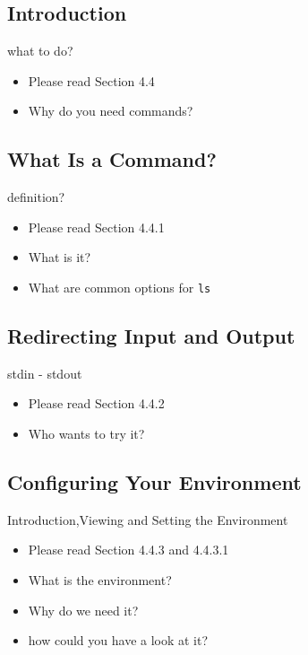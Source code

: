 \documentclass[hyperref={pdfpagelabels=false}]{beamer}
\newcommand{\code}[1]{\colorbox{lGray}{\texttt{#1}}}
\begin{document}
    \subsection{Introduction}
    	\begin{frame}{what to do?}
			\begin{itemize}
				\item<1-> Please read Section 4.4
                \item<2-> Why do you need commands?
            \end{itemize}
        \end{frame}
    \subsection{What Is a Command?}
    	\begin{frame}{definition?}
			\begin{itemize}
				\item<1-> Please read Section 4.4.1
                \item<2-> What is it?
                \item<3-> What are common options for \code{ls}
            \end{itemize}
		\end{frame}
    \subsection{Redirecting Input and Output}
    	\begin{frame}{stdin - stdout}
			\begin{itemize}
				\item<1-> Please read Section 4.4.2
                \item<2-> Who wants to try it?
            \end{itemize}
		\end{frame}
    \subsection{Configuring Your Environment}
    	\begin{frame}{Introduction,Viewing and Setting the Environment}
			\begin{itemize}
				\item<1-> Please read Section 4.4.3 and 4.4.3.1
                \item<2-> What is the environment?
                \item<3-> Why do we need it?
                \item<4-> how could you have a look at it?
            \end{itemize}
		\end{frame}
\end{document}
